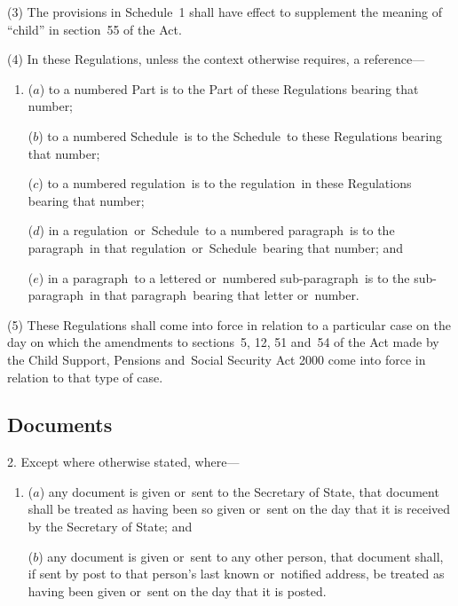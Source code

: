 \documentclass[12pt,a4paper]{article}
\begin{document}
(3) The provisions in Schedule~1 shall have effect to supplement the meaning of “child” in section~55 of the Act.

(4) In these Regulations, unless the context otherwise requires, a reference—
\begin{enumerate}\item[]
($a$) to a numbered Part is to the Part of these Regulations bearing that number;

($b$) to a numbered Schedule~is to the Schedule~to these Regulations bearing that number;

($c$) to a numbered regulation~is to the regulation~in these Regulations bearing that number;

($d$) in a regulation~or~Schedule~to a numbered paragraph~is to the paragraph~in that regulation~or~Schedule~bearing that number; and

($e$) in a paragraph~to a lettered or~numbered sub-paragraph~is to the sub-paragraph~in that paragraph~bearing that letter or~number.
\end{enumerate}

(5) These Regulations shall come into force in relation to a particular case on the day on which the amendments to sections~5, 
12, 
51
and~54  %
of the Act made by the Child Support, Pensions and~Social Security Act 2000 come into force in relation to that type of case.


\subsection[2. Documents]{Documents}

2.  Except where otherwise stated, where—
\begin{enumerate}\item[]
($a$) any document is given or~sent to the Secretary of State, that document shall be treated as having been so given or~sent on the day that it is received by the Secretary of State; and

($b$) any document is given or~sent to any other person, that document shall, if sent by post to that person’s last known or~notified address, be treated as having been given or~sent on the day that it is posted.
\end{enumerate}
\end{document}
